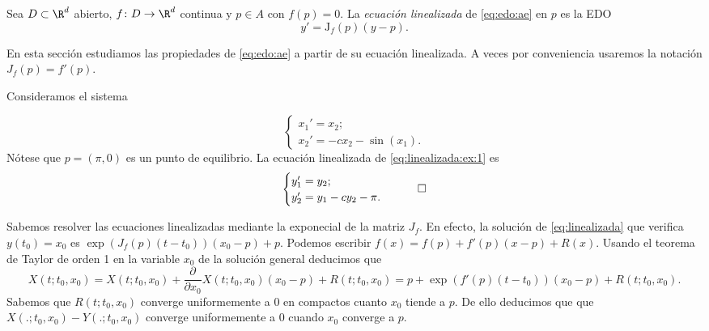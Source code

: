 \begin{definition}
  Sea $D \subset \R^d$ abierto, $f\colon D \to \R^d$ continua y $p \in A$ con $f(p) = 0$. La
  \emph{ecuación linealizada} de \eqref{eq:edo:ae} en $p$ es la EDO
  \begin{equation}
    \label{eq:linealizada}
    y' = \mathrm{J}_f(p)(y-p).
    \tag{L}
  \end{equation}
\end{definition}

En esta sección estudiamos las propiedades de \eqref{eq:edo:ae} a partir de su ecuación
linealizada. A veces por conveniencia usaremos la notación $J_f(p) = f'(p)$.

\begin{ex}
  Consideramos el sistema
  
  \begin{equation}
    \label{eq:linealizada:ex:1}
    \begin{cases}
      x_1' = x_2; \\
      x_2' = -c x_2 - \sin(x_1).
    \end{cases}
  \end{equation}
  Nótese que $p = (\pi, 0)$ es un punto de equilibrio. La ecuación linealizada de
  \eqref{eq:linealizada:ex:1} es
  \begin{equation*}
    \label{eq:linealizada:ex:2}
    \begin{cases}
      y_1' = y_2; \\
      y_2' = y_1 -c y_2 - \pi.
    \end{cases}
    \qedhere
  \end{equation*}
\end{ex}

Sabemos resolver las ecuaciones linealizadas mediante la exponecial de la matriz $J_f$. En efecto,
la solución de \eqref{eq:linealizada} que verifica $y(t_0) = x_0$ es
$\exp(J_f(p)(t-t_0)) (x_0-p) + p$. Podemos escribir $f(x) = f(p) + f'(p)(x-p) + R(x)$. Usando el
teorema de Taylor de orden 1 en la variable $x_0$ de la solución general deducimos que
\[ X(t; t_0, x_0) = X(t; t_0, x_0) + \frac{\partial}{\partial x_0}X(t; t_0, x_0) (x_0-p) + R(t; t_0,
  x_0) = p + \exp(f'(p)(t-t_0)) (x_0- p) + R(t; t_0, x_0). \] Sabemos que $R(t; t_0, x_0)$ converge
uniformemente a $0$ en compactos cuanto $x_0$ tiende a $p$. De ello deducimos que que
$X(. ; t_0, x_0) - Y(.;t_0,x_0)$ converge uniformemente a $0$ cuando $x_0$ converge a $p$.

